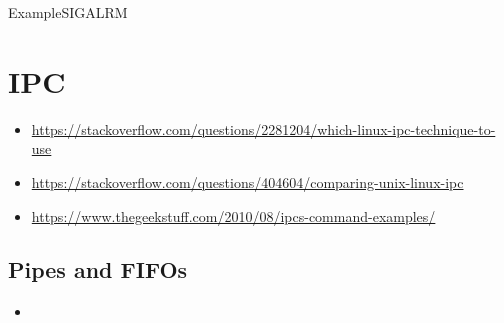 \begin{frame}{Example}{SIGALRM}
  \begin{minipage}{.45\linewidth}
  \end{minipage}\quad
  \begin{minipage}{.45\linewidth}
  \end{minipage}
\end{frame}

\section{IPC}
\label{sec:ipc}

\begin{itemize}
\item \url{https://stackoverflow.com/questions/2281204/which-linux-ipc-technique-to-use}
\item \url{https://stackoverflow.com/questions/404604/comparing-unix-linux-ipc}
\item \url{https://www.thegeekstuff.com/2010/08/ipcs-command-examples/}
\end{itemize}

\subsection{Pipes and FIFOs}
\label{sec:pipes-fifos}

\begin{itemize}
\item {}
\end{itemize}

